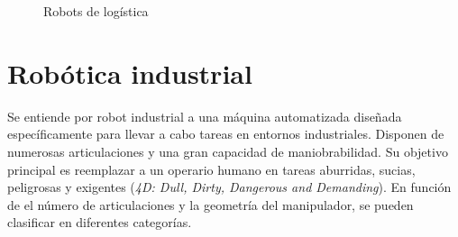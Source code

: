 \begin{figure} [ht!]
    \centering    
    \hspace{1cm}

    \caption{Robots de logística}
\end{figure}


\newpage
\section{Robótica industrial}
\label{sec:rob_industrial}
\noindent Se entiende por robot industrial a una máquina automatizada diseñada específicamente para llevar a cabo tareas en entornos industriales. 
Disponen de numerosas articulaciones y una gran capacidad de maniobrabilidad. Su objetivo principal es reemplazar a un 
operario humano en tareas aburridas, sucias, peligrosas y exigentes (\textit{4D: Dull, Dirty, Dangerous and Demanding}).
En función de el número de articulaciones y la geometría del manipulador, se pueden clasificar en diferentes categorías.

